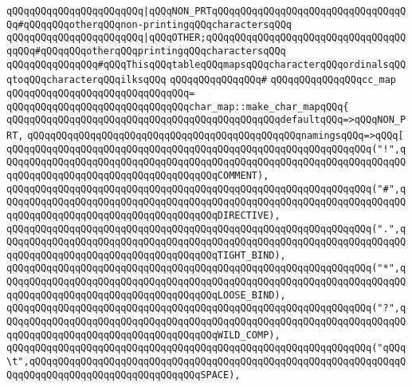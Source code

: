 \verb|qQQqqQQqqQQqqQQqqQQqqQQq|\verb#|qQQqNON_PRTqQQqqQQqqQQqqQQqqQQqqQQqqQQqqQQqqQQq#\verb|#qQQqqQQqotherqQQqnon-printingqQQqcharactersqQQq|\newline
\verb|qQQqqQQqqQQqqQQqqQQqqQQq|\verb#|qQQqOTHER;qQQqqQQqqQQqqQQqqQQqqQQqqQQqqQQqqQQqqQQq#\verb|#qQQqqQQqotherqQQqprintingqQQqcharactersqQQq|\newline
\newline
\verb|qQQqqQQqqQQqqQQq#qQQqThisqQQqtableqQQqmapsqQQqcharacterqQQqordinalsqQQqtoqQQqcharacterqQQqilksqQQq|\newline
\verb|qQQqqQQqqQQqqQQq#|\newline
\verb|qQQqqQQqqQQqqQQqcc_map|\newline
\verb|qQQqqQQqqQQqqQQqqQQqqQQqqQQqqQQq=|\newline
\verb|qQQqqQQqqQQqqQQqqQQqqQQqqQQqqQQqchar_map::make_char_mapqQQq{|\newline
\verb|qQQqqQQqqQQqqQQqqQQqqQQqqQQqqQQqqQQqqQQqqQQqqQQqdefaultqQQq=>qQQqNON_PRT,|\newline
\verb|qQQqqQQqqQQqqQQqqQQqqQQqqQQqqQQqqQQqqQQqqQQqqQQqnamingsqQQq=>qQQq[|\newline
\verb|qQQqqQQqqQQqqQQqqQQqqQQqqQQqqQQqqQQqqQQqqQQqqQQqqQQqqQQqqQQqqQQq("!",qQQqqQQqqQQqqQQqqQQqqQQqqQQqqQQqqQQqqQQqqQQqqQQqqQQqqQQqqQQqqQQqqQQqqQQqqQQqqQQqqQQqqQQqqQQqqQQqqQQqqQQqqQQqCOMMENT),|\newline
\verb|qQQqqQQqqQQqqQQqqQQqqQQqqQQqqQQqqQQqqQQqqQQqqQQqqQQqqQQqqQQqqQQq("#",qQQqqQQqqQQqqQQqqQQqqQQqqQQqqQQqqQQqqQQqqQQqqQQqqQQqqQQqqQQqqQQqqQQqqQQqqQQqqQQqqQQqqQQqqQQqqQQqqQQqqQQqqQQqDIRECTIVE),|\newline
\verb|qQQqqQQqqQQqqQQqqQQqqQQqqQQqqQQqqQQqqQQqqQQqqQQqqQQqqQQqqQQqqQQq(".",qQQqqQQqqQQqqQQqqQQqqQQqqQQqqQQqqQQqqQQqqQQqqQQqqQQqqQQqqQQqqQQqqQQqqQQqqQQqqQQqqQQqqQQqqQQqqQQqqQQqqQQqqQQqTIGHT_BIND),|\newline
\verb|qQQqqQQqqQQqqQQqqQQqqQQqqQQqqQQqqQQqqQQqqQQqqQQqqQQqqQQqqQQqqQQq("*",qQQqqQQqqQQqqQQqqQQqqQQqqQQqqQQqqQQqqQQqqQQqqQQqqQQqqQQqqQQqqQQqqQQqqQQqqQQqqQQqqQQqqQQqqQQqqQQqqQQqqQQqqQQqLOOSE_BIND),|\newline
\verb|qQQqqQQqqQQqqQQqqQQqqQQqqQQqqQQqqQQqqQQqqQQqqQQqqQQqqQQqqQQqqQQq("?",qQQqqQQqqQQqqQQqqQQqqQQqqQQqqQQqqQQqqQQqqQQqqQQqqQQqqQQqqQQqqQQqqQQqqQQqqQQqqQQqqQQqqQQqqQQqqQQqqQQqqQQqqQQqWILD_COMP),|\newline
\verb|qQQqqQQqqQQqqQQqqQQqqQQqqQQqqQQqqQQqqQQqqQQqqQQqqQQqqQQqqQQqqQQq("qQQq\t",qQQqqQQqqQQqqQQqqQQqqQQqqQQqqQQqqQQqqQQqqQQqqQQqqQQqqQQqqQQqqQQqqQQqqQQqqQQqqQQqqQQqqQQqqQQqqQQqqQQqSPACE),|\newline
